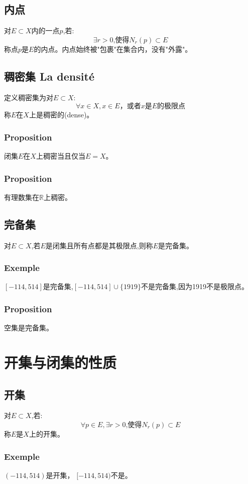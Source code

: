 \documentclass[12pt, a4paper, oneside]{ctexbook}
\begin{document}
  \subsection{内点}
  对$E\subset X$内的一点$p$,若:
  $$
    \exists r>0\mbox{,使得}N_r(p)\subset E
  $$称点$p$是$E$的内点。内点始终被"包裹"在集合内，没有"外露"。

  \subsection{稠密集 La densité}
  定义稠密集为对$E\subset X$:
  $$
  \forall x\in X, x\in E\text{，或者}x{是}E{的极限点}
  $$
  称$E$在$X$上是稠密的(dense)。
  \subsubsection{Proposition}
  闭集$E$在$X$上稠密当且仅当$E=X$。
  \subsubsection{Proposition}
  有理数集在$\mathbb{R}$上稠密。

  \subsection{完备集}
  对$E\subset X$,若$E$是闭集且所有点都是其极限点,则称$E$是完备集。
  \subsubsection{Exemple}
  $[-114,514]$是完备集,$[-114,514]\cup\{1919\}$不是完备集,因为1919不是极限点。
  \subsubsection{Proposition}
  空集是完备集。

\section{开集与闭集的性质}
  \subsection{开集}
  对$E\subset X$,若:
  $$
    \forall p\in E, \exists r>0\text{,使得}N_r(p)\subset E
  $$称$E$是$X$上的开集。
  \subsubsection{Exemple}
  $(-114,514)$是开集， $[-114,514)$不是。
\end{document}
